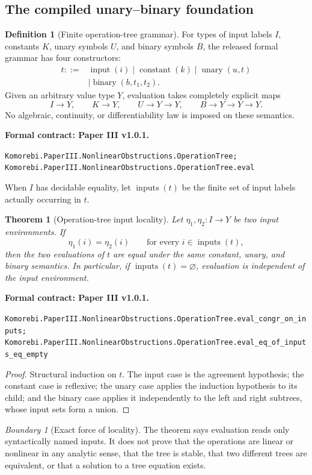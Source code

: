 \documentclass[11pt,a4paper]{article}
\newtheorem{theorem}{Theorem}[section]
\theoremstyle{plain}
\theoremstyle{definition}
\newtheorem{definition}[definition]{Definition}
\theoremstyle{remark}
\newtheorem{boundary}[boundary]{Boundary}
\newcommand{\leanname}[1]{\nolinkurl{#1}}
\newcommand{\statusleanthree}[1]{\par\smallskip\noindent\begin{minipage}{\linewidth}{\color{leanblue}\textbf{Formal contract: Paper III v1.0.1.}}\par\begingroup\small\raggedright\leanname{#1}\par\endgroup\end{minipage}\par\smallskip}
\begin{document}
\subsection{The compiled unary--binary foundation}

\begin{definition}[Finite operation-tree grammar]
\label{def:compiled-operation-tree}
For types of input labels $I$, constants $K$, unary symbols $U$, and binary
symbols $B$, the released formal grammar has four constructors:
\[
\begin{aligned}
t ::={}&\operatorname{input}(i)
\mid\operatorname{constant}(k)
\mid\operatorname{unary}(u,t)\\
&\mid\operatorname{binary}(b,t_1,t_2).
\end{aligned}
\]
Given an arbitrary value type $Y$, evaluation takes completely explicit maps
\[
I\to Y,\qquad K\to Y,\qquad U\to Y\to Y,\qquad
B\to Y\to Y\to Y.
\]
No algebraic, continuity, or differentiability law is imposed on these
semantics.
\end{definition}
\statusleanthree{Komorebi.PaperIII.NonlinearObstructions.OperationTree; Komorebi.PaperIII.NonlinearObstructions.OperationTree.eval}

When $I$ has decidable equality, let $\operatorname{inputs}(t)$ be the finite
set of input labels actually occurring in $t$.

\begin{theorem}[Operation-tree input locality]
\label{thm:tree-locality}
Let $\eta_1,\eta_2:I\to Y$ be two input environments.  If
\[
\eta_1(i)=\eta_2(i)
\qquad\text{for every }i\in\operatorname{inputs}(t),
\]
then the two evaluations of $t$ are equal under the same constant, unary, and
binary semantics.  In particular, if
$\operatorname{inputs}(t)=\varnothing$, evaluation is independent of the
input environment.
\end{theorem}
\statusleanthree{Komorebi.PaperIII.NonlinearObstructions.OperationTree.eval_congr_on_inputs; Komorebi.PaperIII.NonlinearObstructions.OperationTree.eval_eq_of_inputs_eq_empty}

\begin{proof}
Structural induction on $t$.  The input case is the agreement hypothesis;
the constant case is reflexive; the unary case applies the induction
hypothesis to its child; and the binary case applies it independently to the
left and right subtrees, whose input sets form a union.
\end{proof}

\begin{boundary}[Exact force of locality]
The theorem says evaluation reads only syntactically named inputs.  It does
not prove that the operations are linear or nonlinear in any analytic sense,
that the tree is stable, that two different trees are equivalent, or that a
solution to a tree equation exists.
\end{boundary}
\end{document}
